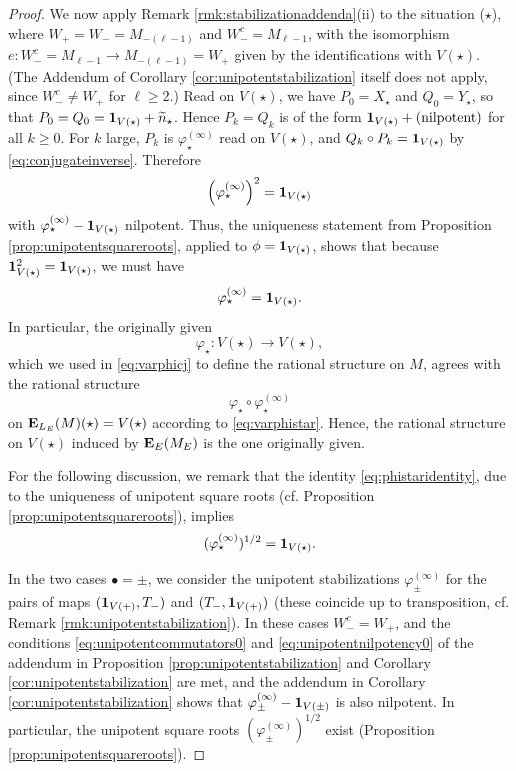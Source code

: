 \documentclass[a4paper,12pt,reqno]{amsart}
\newcommand{\EE}{{\rm\bf E}}
\theoremstyle{plain}
\theoremstyle{remark}
\begin{document}
\begin{proof}
    We now apply Remark \ref{rmk:stabilizationaddenda}(ii) to the situation ($\star$), where $W_+=W_-=M_{-(\ell-1)}$ and $W_-^c=M_{\ell-1}$, with the isomorphism $e\colon W_-^c=M_{\ell-1}\to M_{-(\ell-1)}=W_+$ given by the identifications with $V(\star)$. (The Addendum of Corollary \ref{cor:unipotentstabilization} itself does not apply, since $W_-^c\neq W_+$ for $\ell\geq2$.) Read on $V(\star)$, we have $P_0=X_\star$ and $Q_0=Y_\star$, so that $P_0=Q_0={\bf1}_{V(\star)}+\widetilde{n}_\star$. Hence $P_k=Q_k$ is of the form ${\bf1}_{V(\star)}+(\text{nilpotent})$ for all $k\geq0$. For $k$ large, $P_k$ is $\varphi_\star^{(\infty)}$ read on $V(\star)$, and $Q_k\circ P_k={\bf1}_{V(\star)}$ by \eqref{eq:conjugateinverse}. Therefore
    \[
    \left(\varphi_\star^{(\infty)}\right)^2={\bf1}_{V(\star)}
    \]
    with $\varphi_\star^{(\infty)}-{\bf1}_{V(\star)}$ nilpotent. Thus, the uniqueness statement from Proposition \ref{prop:unipotentsquareroots}, applied to $\phi={\bf1}_{V(\star)}$, shows that because ${\bf1}_{V(\star)}^2={\bf1}_{V(\star)}$, we must have
    \begin{equation}
      \varphi_\star^{(\infty)}={\bf1}_{V(\star)}.
      \label{eq:phistaridentity}
    \end{equation}
    In particular, the originally given
    \[
    \varphi_\star\colon V(\star)\to V(\star),
    \]
    which we used in \eqref{eq:varphicj} to define the rational structure on $M$, agrees with the rational structure
    \[
    \varphi_\star\circ\varphi_\star^{(\infty)}
    \]
    on $\EE_{L_E}(M)(\star)=V(\star)$ according to \eqref{eq:varphistar}. Hence, the rational structure on $V(\star)$ induced by $\EE_E(M_E)$ is the one originally given.

    For the following discussion, we remark that the identity \eqref{eq:phistaridentity}, due to the uniqueness of unipotent square roots (cf. Proposition \ref{prop:unipotentsquareroots}), implies
    \begin{equation}
      (\varphi_{\star}^{(\infty)})^{1/2}={\bf1}_{V(\star)}.
      \label{eq:starsquarerootsinverses}
    \end{equation}
    
    In the two cases $\bullet=\pm$, we consider the unipotent stabilizations $\varphi_{\pm}^{(\infty)}$ for the pairs of maps $({\bf1}_{V(+)},T_-)$ and $(T_-,{\bf1}_{V(+)})$ (these coincide up to transposition, cf. Remark \ref{rmk:unipotentstabilization}). In these cases $W_-^c=W_+$, and the conditions \eqref{eq:unipotentcommutators0} and \eqref{eq:unipotentnilpotency0} of the addendum in Proposition \ref{prop:unipotentstabilization} and Corollary \ref{cor:unipotentstabilization} are met, and the addendum in Corollary \ref{cor:unipotentstabilization} shows that $\varphi_{\pm}^{(\infty)}-{\bf1}_{V(\pm)}$ is also nilpotent. In particular, the unipotent square roots $(\varphi_{\pm}^{(\infty)})^{1/2}$ exist (Proposition \ref{prop:unipotentsquareroots}).


\end{proof}
\end{document}
